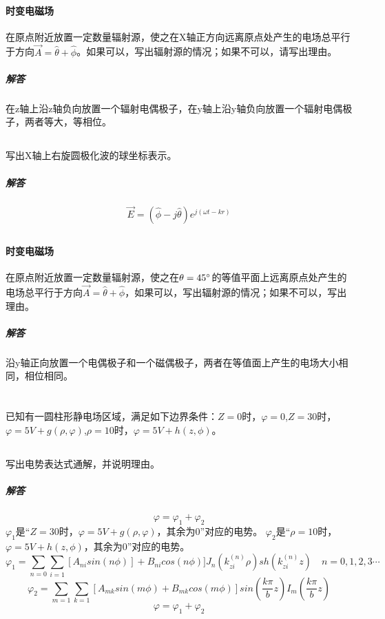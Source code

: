 \documentclass[UTF8]{ctexart}
\begin{document}
\paragraph{时变电磁场}
在原点附近放置一定数量辐射源，使之在X轴正方向远离原点处产生的电场总平行于方向$\vec A=\hat\theta+\hat\phi$。如果可以，写出辐射源的情况；如果不可以，请写出理由。
\subparagraph{解答}
在z轴上沿z轴负向放置一个辐射电偶极子，在y轴上沿y轴负向放置一个辐射电偶极子，两者等大，等相位。
\subsection{}
\paragraph{}
写出X轴上右旋圆极化波的球坐标表示。
\subparagraph{解答}
\[ \vec E=(\hat \phi-j\hat \theta)e^{j(\omega t-kr)}\]
\subsection{}
\paragraph{时变电磁场}
在原点附近放置一定数量辐射源，使之在$\theta =45\degree$的等值平面上远离原点处产生的电场总平行于方向$\vec A=\hat\theta + \hat\phi$，如果可以，写出辐射源的情况；如果不可以，写出理由。
\subparagraph{解答}
沿y轴正向放置一个电偶极子和一个磁偶极子，两者在等值面上产生的电场大小相同，相位相同。
\section{}
\paragraph{}
已知有一圆柱形静电场区域，满足如下边界条件：$Z=0$时，$\varphi=0$,$Z=30$时，$\varphi=5V+g(\rho,\varphi)$,$\rho=10$时，$\varphi=5V+h(z,\phi)$。
\subsection{}
\paragraph{}
写出电势表达式通解，并说明理由。
\subparagraph{解答}
\[\varphi = \varphi_1 + \varphi_2\]
$\varphi_1$是“$Z=30$时，$\varphi=5V+g(\rho,\varphi)$，其余为0”对应的电势。
$\varphi_2$是“$\rho=10$时，$\varphi=5V+h(z,\phi)$，其余为0”对应的电势。
\[\varphi_1=\sum_{n=0}^{}\sum_{i=1}^{}[A_{ni}sin(n\phi)]+B_{ni}cos(n\phi)]J_n(k_{zi}^{(n)}\rho)sh(k_{zi}^{(n)}z)\quad n=0,1,2,3\cdots\]
\[\varphi_2=\sum_{m=1}^{}\sum_{k=1}^{}[A_{mk}sin(m\phi)+B_{mk}cos(m\phi)]sin(\frac{k\pi}{b}z)I_m(\frac{k\pi}{b}z)\]
\[\varphi=\varphi_1+\varphi_2\]
\end{document}
